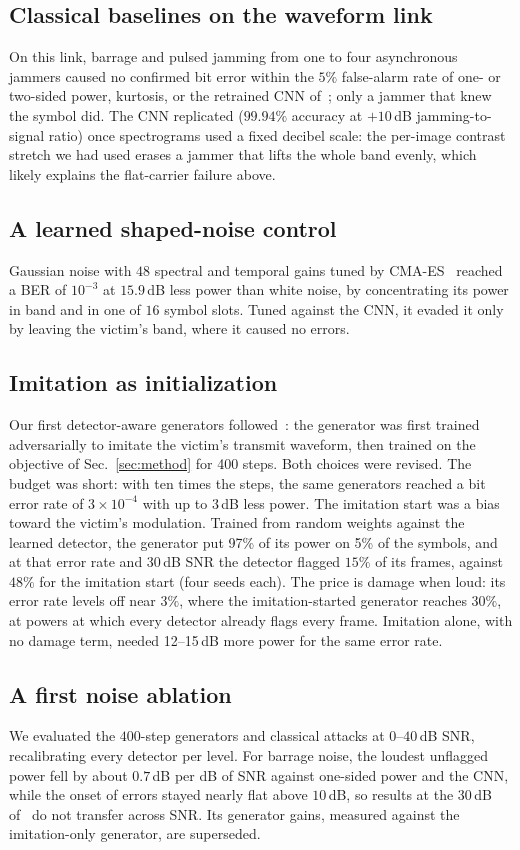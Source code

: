 \documentclass[conference]{IEEEtran}
\begin{document}
\subsection{Classical baselines on the waveform link}
On this link, barrage and pulsed jamming from one to four asynchronous jammers caused no confirmed bit error within the $5\%$ false-alarm rate of one- or two-sided power, kurtosis, or the retrained CNN of~\cite{9707819}; only a jammer that knew the symbol did.
The CNN replicated ($99.94\%$ accuracy at $+10$\,dB jamming-to-signal ratio) once spectrograms used a fixed decibel scale: the per-image contrast stretch we had used erases a jammer that lifts the whole band evenly, which likely explains the flat-carrier failure above.

\subsection{A learned shaped-noise control}
Gaussian noise with $48$ spectral and temporal gains tuned by CMA-ES~\cite{TODO-key} reached a BER of $10^{-3}$ at $15.9$\,dB less power than white noise, by concentrating its power in band and in one of $16$ symbol slots.
Tuned against the CNN, it evaded it only by leaving the victim's band, where it caused no errors.

\subsection{Imitation as initialization}
Our first detector-aware generators followed~\cite{11184988}: the generator was first trained adversarially to imitate the victim's transmit waveform, then trained on the objective of Sec.~\ref{sec:method} for 400 steps.
Both choices were revised.
The budget was short: with ten times the steps, the same generators reached a bit error rate of $3\times10^{-4}$ with up to 3\,dB less power.
The imitation start was a bias toward the victim's modulation.
Trained from random weights against the learned detector, the generator put 97\% of its power on 5\% of the symbols, and at that error rate and 30\,dB SNR the detector flagged $15\%$ of its frames, against $48\%$ for the imitation start (four seeds each).
The price is damage when loud: its error rate levels off near $3\%$, where the imitation-started generator reaches $30\%$, at powers at which every detector already flags every frame.
Imitation alone, with no damage term, needed 12--15\,dB more power for the same error rate.

\subsection{A first noise ablation}
We evaluated the $400$-step generators and classical attacks at $0$--$40$\,dB SNR, recalibrating every detector per level.
For barrage noise, the loudest unflagged power fell by about $0.7$\,dB per dB of SNR against one-sided power and the CNN, while the onset of errors stayed nearly flat above $10$\,dB, so results at the $30$\,dB of~\cite{11184988} do not transfer across SNR.
Its generator gains, measured against the imitation-only generator, are superseded.
\end{document}
